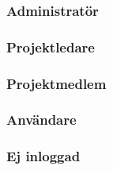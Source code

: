 \documentclass[a4paper]{article}
\begin{document}
		\subsubsection*{Administratör}
		\subsubsection*{Projektledare}
		\subsubsection*{Projektmedlem}
		\subsubsection*{Användare}
		\subsubsection*{Ej inloggad}
\end{document}
